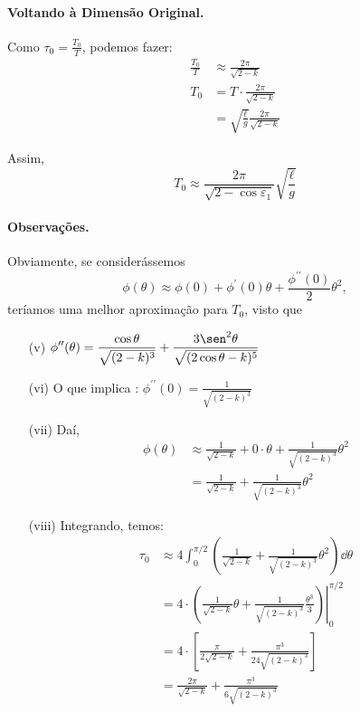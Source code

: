 \begin{solution}
\paragraph{Voltando à Dimensão Original.}
Como $\tau_0 = \frac{T_0}{T}$, podemos fazer:
\begin{align*}
 \frac{T_0}{T} &\approx \frac{2\pi}{\sqrt{2 - k}}\\
	T_0 & = T \cdot \frac{2\pi}{\sqrt{2 - k}}\\
	&= \sqrt{\frac{\ell}{g}}\frac{2\pi}{\sqrt{2 - k}}
\end{align*}

Assim,
\begin{equation}
 T_0 \approx \frac{2\pi}{\sqrt{2 - \cos\varepsilon_1}} \sqrt{\frac{\ell}{g}}
\label{eq:original}
\end{equation}

\paragraph{Observações.}
Obviamente, se considerássemos 
\[
 \phi(\theta) \approx \phi(0) + \phi^{\prime}(0) \theta + \frac{\phi^{\prime\prime}(0)}{2}\theta ^2,
\]
teríamos uma melhor aproximação para $T_0$, visto que
\begin{itemize}
	\item[(v)] $ \displaystyle \phi^{\prime\prime}(\theta) = \frac{\cos\theta}{\sqrt{(2-k)^3}} + \frac{3\sen^2\theta}{\sqrt{(2\cos\theta - k)^5}}$
	\item[(vi)] O que implica : $ \displaystyle \phi^{\prime\prime}(0) = \frac{1}{\sqrt{(2-k)^3}} $
	\item[(vii)] Daí, 
	 \begin{align*}
	  \phi(\theta) 
			&\approx \frac{1}{\sqrt{2-k}} + 0\cdot \theta + \frac{1}{\sqrt{(2-k)^3}} \theta^2\\
			&= \frac{1}{\sqrt{2-k}} + \frac{1}{\sqrt{(2-k)^3}} \theta^2
		\end{align*}
	\item[(viii)] Integrando, temos:
	 \begin{align*}
		 \tau_0 &\approx 4 \int_{0}^{\pi/2} \left(\frac{1}{\sqrt{2-k}} + \frac{1}{\sqrt{(2-k)^3}} \theta^2\right)\dd{\theta}\\
			&= 4 \cdot \left.\left(\frac{1}{\sqrt{2-k}} \theta + \frac{1}{\sqrt{(2-k)^3}} \frac{\theta^3}{3}\right)\right|_{0}^{\pi/2}\\
			&= 4 \cdot \left[\frac{\pi}{2\sqrt{2-k}} + \frac{\pi^3}{24\sqrt{(2-k)^3}}\right]\\
			&= \frac{2\pi}{\sqrt{2-k}} + \frac{\pi^3}{6\sqrt{(2-k)^3}}
		\end{align*}
\end{itemize}


\end{solution}
